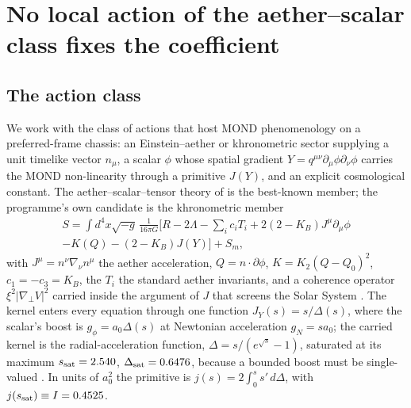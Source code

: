 \documentclass[fleqn,usenatbib]{mnras}
\begin{document}
\section{No local action of the aether--scalar class fixes the coefficient}
\label{sec:theorem}
\subsection{The action class}
We work with the class of actions that host MOND phenomenology on a preferred-frame chassis: an Einstein--aether or khronometric sector \citep{JacobsonMattingly2001,Blas2011} supplying a unit timelike vector $n_\mu$, a scalar $\phi$ whose spatial gradient $Y=q^{\mu\nu}\partial_\mu\phi\partial_\nu\phi$ carries the MOND non-linearity through a primitive $J(Y)$, and an explicit cosmological constant. The aether--scalar--tensor theory of \citet{SkordisZlosnik2021} is the best-known member; the programme's own candidate \citep{Zimmerman2026filtered,Zimmerman2026ceiling} is the khronometric member
\begin{equation}
\begin{split}
S=\int d^4x\sqrt{-g}\,\frac{1}{16\pi G}\Big[R-2\Lambda-\sum_i c_iT_i+2(2-K_B)J^\mu\partial_\mu\phi\\
-K(Q)-(2-K_B)J(Y)\Big]+S_m,
\end{split}
\label{eq:action}
\end{equation}
with $J^\mu=n^\nu\nabla_\nu n^\mu$ the aether acceleration, $Q=n\cdot\partial\phi$, $K=K_2(Q-Q_0)^2$, $c_1=-c_3=K_B$, the $T_i$ the standard aether invariants, and a coherence operator $\xi^2|\nabla_\perp V|^2$ carried inside the argument of $J$ that screens the Solar System \citep{Zimmerman2026filtered}. The kernel enters every equation through one function $J_Y(s)=s/\Delta(s)$, where the scalar's boost is $g_\phi=a_0\Delta(s)$ at Newtonian acceleration $g_N=sa_0$; the carried kernel is the radial-acceleration function, $\Delta=s/(e^{\sqrt s}-1)$, saturated at its maximum $s_{\rm sat}=2.540$, $\Delta_{\rm sat}=0.6476$, because a bounded boost must be single-valued \citep{Zimmerman2026ceiling}. In units of $a_0^2$ the primitive is $j(s)=2\int_0^s s'\,d\Delta$, with $j(s_{\rm sat})\equiv I=0.4525$.
\end{document}
